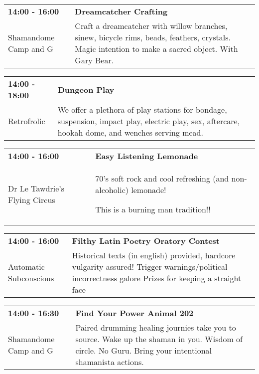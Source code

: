 \begin{tabular}{ p{1in} p{2.2in} }
    \textbf{14:00 - 16:00} & \textbf{Dreamcatcher Crafting} \\
    Shamandome Camp \newline 615 and G & Craft a dreamcatcher with willow branches, sinew, bicycle rims, beads, feathers, crystals. Magic intention to make a sacred object. With Gary Bear. \\
    \hline 
\end{tabular}
    
\begin{tabular}{ p{1in} p{2.2in} }
    \textbf{14:00 - 18:00} & \textbf{Dungeon Play} \\
    Retrofrolic \newline  & We offer a plethora of play stations for bondage, suspension, impact play, electric play, sex, aftercare, hookah dome, and wenches serving mead. \\
    \hline 
\end{tabular}
    
\begin{tabular}{ p{1in} p{2.2in} }
    \textbf{14:00 - 16:00} & \textbf{Easy Listening Lemonade} \\
    Dr Le Tawdrie's Flying Circus \newline  & 70's soft rock and cool refreshing (and non-alcoholic) lemonade! 

This is a burning man tradition!! \\
    \hline 
\end{tabular}
    
\begin{tabular}{ p{1in} p{2.2in} }
    \textbf{14:00 - 16:00} & \textbf{Filthy Latin Poetry Oratory Contest} \\
    Automatic Subconscious \newline  & Historical texts (in english) provided, hardcore vulgarity assured! Trigger warnings/political incorrectness galore Prizes for keeping a straight face \\
    \hline 
\end{tabular}
    
\begin{tabular}{ p{1in} p{2.2in} }
    \textbf{14:00 - 16:30} & \textbf{Find Your Power Animal 202} \\
    Shamandome Camp \newline 615 and G & Paired drumming healing journies take you to source. Wake up the shaman in you. Wisdom of circle. No Guru. Bring your intentional shamanista actions. \\
    \hline 
\end{tabular}
    
